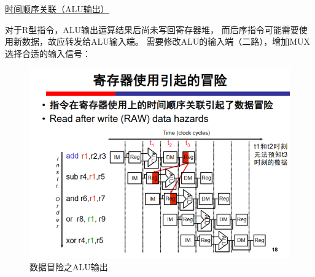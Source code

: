 \documentclass[10pt]{article}
\begin{document}
\underline{\large 时间顺序关联（ALU输出）}

对于R型指令，ALU输出运算结果后尚未写回寄存器堆，
而后序指令可能需要使用新数据，故应转发给ALU输入端。
需要修改ALU的输入端（二路），增加MUX选择合适的输入信号：
\begin{figure}[H]
    \centering
    \includegraphics[scale=0.3]{reg.png}
    \caption{数据冒险之ALU输出}
    \end{figure}
\end{document}
